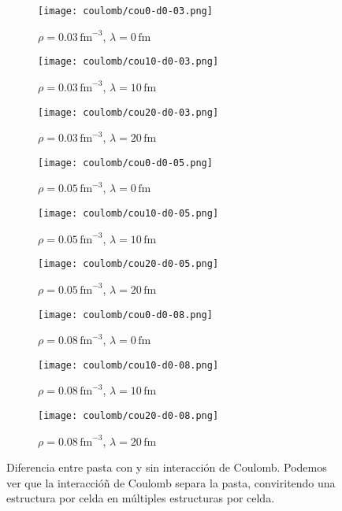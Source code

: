 \begin{figure}
\centering
\begin{subfigure}[h!]{0.3\columnwidth}
  \centering
  \texttt{[image: coulomb/cou0-d0-03.png]}
  \caption{$\rho=0.03\,\text{fm}^{-3}$, $\lambda=0\,\text{fm}$}
\end{subfigure}
\begin{subfigure}[h!]{0.3\columnwidth}
  \centering
  \texttt{[image: coulomb/cou10-d0-03.png]}
  \caption{$\rho=0.03\,\text{fm}^{-3}$, $\lambda=10\,\text{fm}$}
\end{subfigure}
\begin{subfigure}[h!]{0.3\columnwidth}
  \centering
  \texttt{[image: coulomb/cou20-d0-03.png]}
  \caption{$\rho=0.03\,\text{fm}^{-3}$, $\lambda=20\,\text{fm}$}
\end{subfigure}

\begin{subfigure}[h!]{0.3\columnwidth}
  \centering
  \texttt{[image: coulomb/cou0-d0-05.png]}
  \caption{$\rho=0.05\,\text{fm}^{-3}$, $\lambda=0\,\text{fm}$}
\end{subfigure}
\begin{subfigure}[h!]{0.3\columnwidth}
  \centering
  \texttt{[image: coulomb/cou10-d0-05.png]}
  \caption{$\rho=0.05\,\text{fm}^{-3}$, $\lambda=10\,\text{fm}$}
\end{subfigure}
\begin{subfigure}[h!]{0.3\columnwidth}
  \centering
  \texttt{[image: coulomb/cou20-d0-05.png]}
  \caption{$\rho=0.05\,\text{fm}^{-3}$, $\lambda=20\,\text{fm}$}
\end{subfigure}

\begin{subfigure}[h!]{0.3\columnwidth}
  \centering
  \texttt{[image: coulomb/cou0-d0-08.png]}
  \caption{$\rho=0.08\,\text{fm}^{-3}$, $\lambda=0\,\text{fm}$}
\end{subfigure}
\begin{subfigure}[h!]{0.3\columnwidth}
  \centering
  \texttt{[image: coulomb/cou10-d0-08.png]}
  \caption{$\rho=0.08\,\text{fm}^{-3}$, $\lambda=10\,\text{fm}$}
\end{subfigure}
\begin{subfigure}[h!]{0.3\columnwidth}
  \centering
  \texttt{[image: coulomb/cou20-d0-08.png]}
  \caption{$\rho=0.08\,\text{fm}^{-3}$, $\lambda=20\,\text{fm}$}
\end{subfigure}
\caption{Diferencia entre pasta con y sin interacción de Coulomb.
  Podemos ver que la interaccióñ de Coulomb separa la pasta, conviritendo una estructura por celda en múltiples estructuras por celda.}
\label{fig:w-wo-coulomb}
\end{figure}

